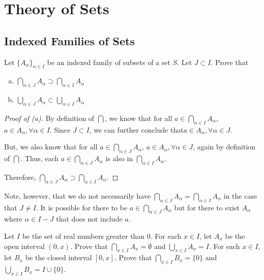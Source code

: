 \chapter{Theory of Sets}

\setcounter{section}{3} %
\section{Indexed Families of Sets}

\begin{problem}[3]
	Let $\{A_\alpha\}_{\alpha \in I}$ be an indexed family of subsets of a set $S$. Let $J \subset I$. Prove that
	\begin{enumerate}[(a)]
		\item $\bigcap_{\alpha \in J} A_\alpha \supset \bigcap_{\alpha \in I} A_\alpha$
		\item $\bigcup_{\alpha \in J} A_\alpha \subset \bigcup_{\alpha \in I} A_\alpha$
	\end{enumerate}
\end{problem}


\begin{proof}[Proof of (a)]
	By definition of $\bigcap$, we know that for all $a \in \bigcap_{\alpha \in I} A_\alpha$, $a \in A_\alpha, \forall \alpha \in I$.
	Since $J \subset I$, we can further conclude that$a \in A_\alpha, \forall \alpha \in J$.

	But, we also know that for all $a \in \bigcap_{\alpha \in J} A_\alpha$, $a \in A_\alpha, \forall \alpha \in J$, again by definition of $\bigcap$.
	Thus, each $a \in \bigcap_{\alpha \in J} A_\alpha$ is also in $\bigcap_{\alpha \in I} A_\alpha$.

	Therefore, $\bigcap_{\alpha \in J} A_\alpha \supset \bigcap_{\alpha \in I} A_\alpha$.
\end{proof}

Note, however, that we do not necessarily have $\bigcap_{\alpha \in J} A_\alpha = \bigcap_{\alpha \in I} A_\alpha$ in the case that $J \neq I$.
It is possible for there to be $a \in \bigcap_{\alpha \in J} A_\alpha$ but for there to exist $A_\alpha$ where $\alpha \in I - J$ that does not include $a$.

\begin{problem}[5]
	Let $I$ be the set of real numbers greater than 0. For each $x \in I$, let $A_x$ be the open interval $(0,x)$.
	Prove that $\bigcap_{x \in I} A_x = \emptyset$ and $\bigcup_{x \in I} A_x = I$.
	For each $x \in I$, let $B_x$ be the closed interval $[0,x]$.
	Prove that $\bigcap_{x \in I} B_x = \{0\}$ and $\bigcup_{x \in I} B_x = I \cup \{0\}$.
\end{problem}

